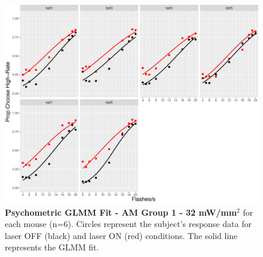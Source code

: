 \begin{figure}
  \centering
   \includegraphics[width=\textwidth]{Figures/chapter4/GLMM_PMFS_32mWpermmsq_group1.png}
  \caption[Psychometric GLMM Fit - AM Group 1 - 32 mW/mm$^{2}$]{\textbf{Psychometric GLMM Fit - AM Group 1 - 32 mW/mm$^{2}$} for each mouse (n=6). Circles represent the subject's response data for laser OFF (black) and laser ON (red) conditions. The solid line represents the GLMM fit.}
   \label{fig:AMg1GLMM32}
\end{figure}
